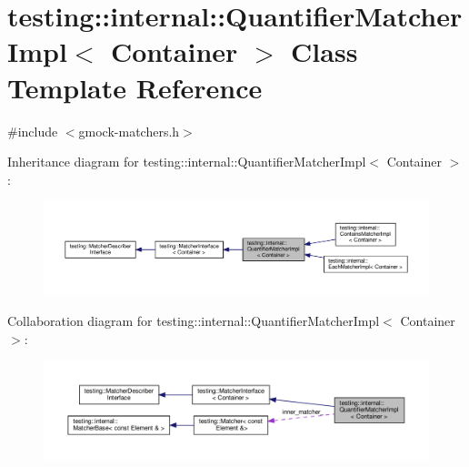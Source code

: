 \hypertarget{classtesting_1_1internal_1_1_quantifier_matcher_impl}{}\section{testing\+:\+:internal\+:\+:Quantifier\+Matcher\+Impl$<$ Container $>$ Class Template Reference}
\label{classtesting_1_1internal_1_1_quantifier_matcher_impl}


{\ttfamily \#include $<$gmock-\/matchers.\+h$>$}



Inheritance diagram for testing\+:\+:internal\+:\+:Quantifier\+Matcher\+Impl$<$ Container $>$\+:
\nopagebreak
\begin{figure}[H]
\begin{center}
\leavevmode
\includegraphics[width=350pt]{classtesting_1_1internal_1_1_quantifier_matcher_impl__inherit__graph}
\end{center}
\end{figure}


Collaboration diagram for testing\+:\+:internal\+:\+:Quantifier\+Matcher\+Impl$<$ Container $>$\+:
\nopagebreak
\begin{figure}[H]
\begin{center}
\leavevmode
\includegraphics[width=350pt]{classtesting_1_1internal_1_1_quantifier_matcher_impl__coll__graph}
\end{center}
\end{figure}
